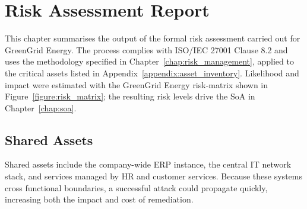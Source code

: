 \chapter{Risk Assessment Report}
\label{chap:risk_assessment_report}

This chapter summarises the output of the formal risk assessment carried out for GreenGrid Energy.
The process complies with ISO/IEC 27001 Clause 8.2 and uses the methodology specified in Chapter~\ref{chap:risk_management}, applied to the critical assets listed in Appendix~\ref{appendix:asset_inventory}.
Likelihood and impact were estimated with the GreenGrid Energy risk-matrix shown in Figure~\ref{figure:risk_matrix}; the resulting risk levels drive the \ac{SoA} in Chapter~\ref{chap:soa}.

\section{Shared Assets}

Shared assets include the company-wide \ac{ERP} instance, the central \ac{IT} network stack, and services managed by \ac{HR} and customer services.
Because these systems cross functional boundaries, a successful attack could propagate quickly, increasing both the impact and cost of remediation.

